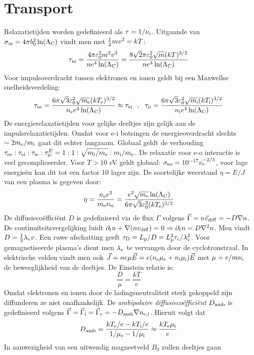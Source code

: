 \documentclass[twoside]{report}
\begin{document}
\section{Transport}
Relaxatietijden worden gedefinieerd als $\tau=1/\nu_{\rm c}$. Uitgaande van
$\sigma_{\rm m}=4\pi b_0^2\ln(\Lambda_{\rm C})$ vindt men met $\half mv^2=kT$:
\[
\tau_{\rm m}=\frac{4\pi\varepsilon_0^2m^2v^3}{ne^4\ln(\Lambda_{\rm C})}=
\frac{8\sqrt{2}\pi\varepsilon_0^2\sqrt{m}(kT)^{3/2}}{ne^4\ln(\Lambda_{\rm C})}
\]
Voor impulsoverdracht tussen elektronen en ionen geldt bij een Maxwellse
snelheidsverdeling:
\[
\tau_{\rm ee}=\frac{6\pi\sqrt{3}\varepsilon_0^2\sqrt{\me}(k\Te)^{3/2}}{\ne e^4\ln(\Lambda_{\rm C})}\approx\tau_{\rm ei}~~,~~
\tau_{\rm ii}=\frac{6\pi\sqrt{3}\varepsilon_0^2\sqrt{\mi}(k\Ti)^{3/2}}{\ni e^4\ln(\Lambda_{\rm C})}
\]
De energierelaxatietijden voor gelijke deeltjes zijn gelijk aan de
impulsrelaxatietijden. Omdat voor e-i botsingen de energieoverdracht slechts
$\sim2\me/\mi$ gaat dit echter langzaam. Globaal geldt de verhouding
$\tau_{\rm ee}:\tau_{\rm ei}:\tau_{\rm ie}:\tau_{\rm ie}^E=1:1:\sqrt{\mi/\me}:\mi/\me$.
\npar
De relaxatie voor e-o interactie is veel gecompliceerder. Voor $T>10$ eV
geldt globaal: $\sigma_{\rm eo}=10^{-17}v_{\rm e}^{-2/5}$, voor lage
energie\"en kan dit tot een factor 10 lager zijn.
\npar
De soortelijke weerstand $\eta=E/J$ van een plasma is gegeven door:
\[
\eta=\frac{\ne e^2}{\me\nu_{\rm ei}}=\frac{e^2\sqrt{\me}\ln(\Lambda_{\rm C})}{6\pi\sqrt{3}\varepsilon_0^2(k\Te)^{3/2}}
\]
De diffusieco\"effici\"ent $D$ is gedefinieerd via de flux $\Gamma$ volgens
$\vec{\Gamma}=n\vv_{\rm diff}=-D\nabla n$. De continuiteitsvergelijking
luidt $\partial_tn+\nabla(nv_{\rm diff})=0\Rightarrow\partial_tn=D\nabla^2n$.
Men vindt $D=\frac{1}{3}\lambda_{\rm v}v$. Een ruwe afschatting geeft
$\tau_{\rm D}=L_{\rm p}/D=L_{\rm p}^2\tau_{\rm c}/\lambda_{\rm v}^2$. Voor
gemagnetiseerde plasma's dient men $\lambda_{\rm v}$ te vervangen door de
cyclotronstraal. In elektrische velden vindt men ook
$\vec{J}=ne\mu\vec{E}=e(\ne\mu_{\rm e}+\ni\mu_{\rm i})\vec{E}$ met
$\mu=e/m\nu_{\rm c}$ de beweeglijkheid van de deeltjes. De Einstein relatie
is:
\[
\frac{D}{\mu}=\frac{kT}{e}
\]
Omdat elektronen en ionen door de ladingsneutraliteit sterk gekoppeld zijn
diffunderen ze niet onafhankelijk. De {\it ambipolaire
diffusieco\"effici\"ent} $D_{\rm amb}$ is gedefinieerd volgens
$\vec{\Gamma}=\vec{\Gamma}_{\rm i}=\vec{\Gamma}_{\rm e}=-D_{\rm amb}\nabla n_{\rm e,i}$.
Hieruit volgt dat
\[
D_{\rm amb}=\frac{k\Te/e-k\Ti/e}{1/\mu_{\rm e}-1/\mu_{\rm i}}\approx\frac{k\Te\mu_{\rm i}}{e}
\]
In aanwezigheid van een uitwendig magneetveld $B_0$ zullen deeltjes gaan
\end{document}
